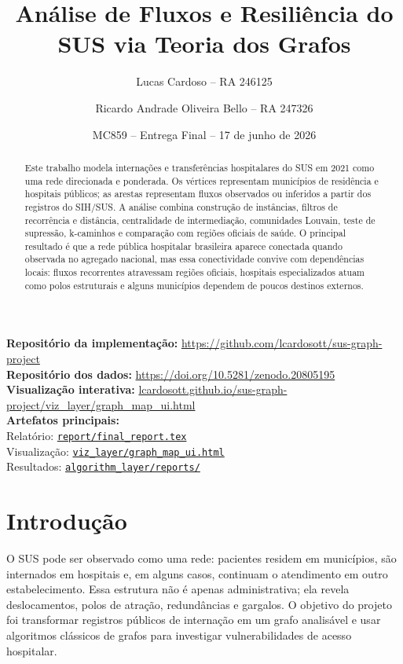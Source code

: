 \documentclass[10pt,a4paper]{article}
\title{\vspace{-1.15cm}Análise de Fluxos e Resiliência do SUS via Teoria dos Grafos}
\author{Lucas Cardoso -- RA 246125 \and Ricardo Andrade Oliveira Bello -- RA 247326}
\date{MC859 -- Entrega Final -- 17 de junho de 2026}
\newcommand{\repo}{https://github.com/lcardosott/sus-graph-project}
\newcommand{\datarepo}{https://doi.org/10.5281/zenodo.20805195}
\newcommand{\repobranch}{gh-pages}
\newcommand{\ghfile}[2]{\href{\repo/blob/\repobranch/#1}{\texttt{#2}}}
\begin{document}
\maketitle

\textbf{Repositório da implementação:} \url{https://github.com/lcardosott/sus-graph-project}\\
\textbf{Repositório dos dados:} \url{\datarepo}\\
\textbf{Visualização interativa:} \href{https://lcardosott.github.io/sus-graph-project/viz_layer/graph_map_ui.html}{lcardosott.github.io/sus-graph-project/viz\_layer/graph\_map\_ui.html}\\
\textbf{Artefatos principais:}\\
Relatório: \ghfile{report/final_report.tex}{\texttt{report/final\_report.tex}}\\
Visualização: \ghfile{viz_layer/graph_map_ui.html}{\texttt{viz\_layer/graph\_map\_ui.html}}\\
Resultados: \ghfile{algorithm_layer/reports/final_analysis_interpretation.md}{\texttt{algorithm\_layer/reports/}}

\begin{abstract}
Este trabalho modela internações e transferências hospitalares do SUS em 2021 como uma rede direcionada e ponderada. Os vértices representam municípios de residência e hospitais públicos; as arestas representam fluxos observados ou inferidos a partir dos registros do SIH/SUS. A análise combina construção de instâncias, filtros de recorrência e distância, centralidade de intermediação, comunidades Louvain, teste de supressão, k-caminhos e comparação com regiões oficiais de saúde. O principal resultado é que a rede pública hospitalar brasileira aparece conectada quando observada no agregado nacional, mas essa conectividade convive com dependências locais: fluxos recorrentes atravessam regiões oficiais, hospitais especializados atuam como polos estruturais e alguns municípios dependem de poucos destinos externos.
\end{abstract}

\section{Introdução}

O SUS pode ser observado como uma rede: pacientes residem em municípios, são internados em hospitais e, em alguns casos, continuam o atendimento em outro estabelecimento. Essa estrutura não é apenas administrativa; ela revela deslocamentos, polos de atração, redundâncias e gargalos. O objetivo do projeto foi transformar registros públicos de internação em um grafo analisável e usar algoritmos clássicos de grafos para investigar vulnerabilidades de acesso hospitalar.
\end{document}
